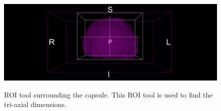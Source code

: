 \begin{figure}[htb!]
\centering
\includegraphics[width=1.0\textwidth]{zach/roi_capsule_measurements.png} \\
\caption{ROI tool surrounding the capsule. This ROI tool is used to find the tri-axial dimensions.}
\label{fig:roi_tool} 
\end{figure}

